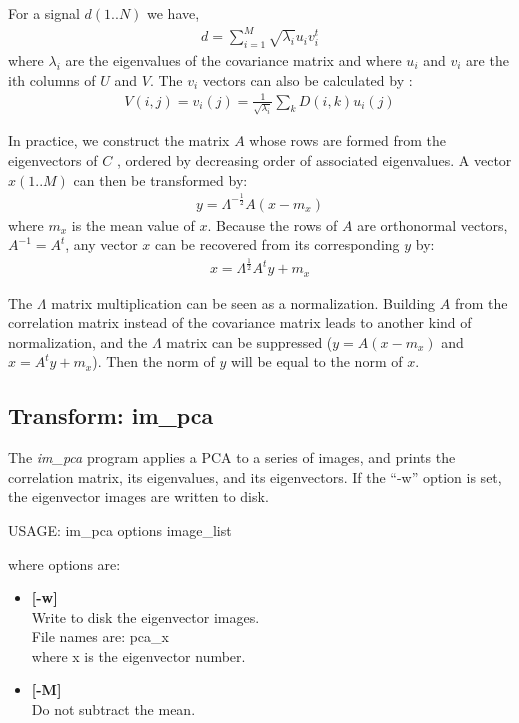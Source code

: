 For a signal $d(1..N)$ we have,
\begin{eqnarray}
d = \sum_{i=1}^{M} \sqrt{\lambda_i} u_i v_i^t
\end{eqnarray}
where $\lambda_i$ are the eigenvalues of the covariance matrix and where
$u_i$ and $v_i$ are the ith columns of $U$ and $V$. The $v_i$
vectors can also be calculated by \cite{ima:bijaoui79}:
 \begin{eqnarray}
 V(i,j) = v_i(j) = \frac{1}{\sqrt{\lambda_i}} \sum_k D(i,k) u_i(j)
\end{eqnarray}

In practice, we construct the matrix $A$ whose rows are formed 
from the eigenvectors
of $C$ \cite{ima:gonzalez93}, ordered by 
decreasing order of associated eigenvalues. 
A vector $x(1..M)$ can then be
transformed by:
\begin{eqnarray}
y = \Lambda^{-\frac{1}{2}}A(x-m_x)
\end{eqnarray}
where $m_x$ is the mean value of $x$.
Because the rows of $A$ are orthonormal vectors, $A^{-1} = A^t$, 
any vector $x$ can be recovered from its corresponding $y$ by:
\begin{eqnarray}
x = \Lambda^{\frac{1}{2}}A^t y + m_x
\end{eqnarray}

The $\Lambda$ matrix multiplication can be seen as a normalization.
Building $A$ from the correlation matrix instead of the covariance matrix
leads to another kind of normalization, 
and the $\Lambda$ matrix can be suppressed 
($y = A(x-m_x)$ and $x = A^t y + m_x$). Then the norm of $y$ will be equal to the
norm of $x$.  

\subsection{Transform: im\_pca}
The {\em im\_pca} program applies a PCA to a series of images, and prints 
the correlation matrix, its eigenvalues, and its eigenvectors. If the 
``-w'' option is set, the eigenvector images are written to disk.
{\bf 
\begin{center}
USAGE: im\_pca options image\_list
\end{center}}
where options are:
\begin{itemize}
\item {\bf[-w]}  \\
Write to  disk the eigenvector images. \\
File names are: pca\_x \\
where x is the eigenvector number.
\item{\bf [-M]} \\
 Do not subtract the mean.
\end{itemize}
